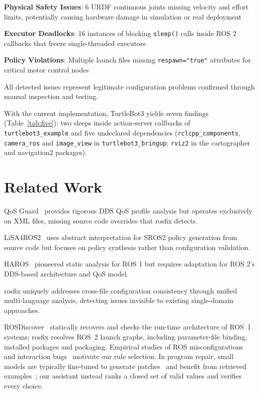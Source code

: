 \documentclass[conference]{IEEEtran}
\newcommand{\code}[1]{\texttt{#1}}
\begin{document}
\textbf{Physical Safety Issues}: 6 URDF continuous joints missing velocity and effort limits,
potentially causing hardware damage in simulation or real deployment

\textbf{Executor Deadlocks}: 16 instances of blocking \code{sleep()} calls inside ROS 2 callbacks
that freeze single-threaded executors

\textbf{Policy Violations}: Multiple launch files missing \code{respawn="true"} attributes for
critical motor control nodes

All detected issues represent legitimate configuration problems confirmed through manual
inspection and testing.

With the current implementation, TurtleBot3 yields seven findings (Table~\ref{tab:five}): two
sleeps inside action-server callbacks of \code{turtlebot3\_example} and five undeclared
dependencies (\code{rclcpp\_components}, \code{camera\_ros} and \code{image\_view} in
\code{turtlebot3\_bringup}; \code{rviz2} in the cartographer and navigation2 packages).

\section{Related Work}

QoS Guard~\cite{lee2025qosguard} provides rigorous DDS QoS profile analysis but operates
exclusively on XML files, missing source code overrides that rosfix detects.

LiSA4ROS2~\cite{zanatta2024lisa4ros2} uses abstract interpretation for SROS2 policy generation
from source code but focuses on policy synthesis rather than configuration validation.

HAROS~\cite{santos2021haros} pioneered static analysis for ROS 1 but requires adaptation for
ROS 2's DDS-based architecture and QoS model.

rosfix uniquely addresses cross-file configuration consistency through unified multi-language
analysis, detecting issues invisible to existing single-domain approaches.

ROSDiscover~\cite{timperley2022rosdiscover} statically recovers and checks the run-time
architecture of ROS~1 systems; rosfix resolves ROS~2 launch graphs, including parameter-file
binding, installed packages and packaging. Empirical studies of ROS
misconfigurations~\cite{canelas2024misconfig} and interaction bugs~\cite{chen2025ibugs} motivate
our rule selection. In program repair, small models are typically fine-tuned to generate
patches~\cite{silva2023repairllama} and benefit from retrieved examples~\cite{wang2023rapgen};
our assistant instead ranks a closed set of valid values and verifies every choice.
\end{document}
